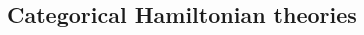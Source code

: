 \documentclass{article}
\begin{document}
\begin{multicols}{2}
	\section{Categorical Hamiltonian theories}
\end{multicols}
\end{document}
